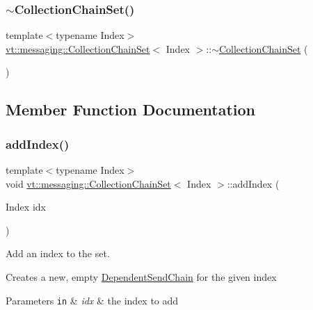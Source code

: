 \subsubsection{\texorpdfstring{$\sim$\+Collection\+Chain\+Set()}{~CollectionChainSet()}}
{\footnotesize\ttfamily template$<$typename Index$>$ \\
\hyperlink{classvt_1_1messaging_1_1_collection_chain_set}{vt\+::messaging\+::\+Collection\+Chain\+Set}$<$ Index $>$\+::$\sim$\hyperlink{classvt_1_1messaging_1_1_collection_chain_set}{Collection\+Chain\+Set} (\begin{DoxyParamCaption}{ }\end{DoxyParamCaption})\hspace{0.3cm}{\ttfamily [inline]}}



\subsection{Member Function Documentation}
\mbox{\label{classvt_1_1messaging_1_1_collection_chain_set_aefc11c9b011b4916c3b80dfc8f776239}} 
\subsubsection{\texorpdfstring{add\+Index()}{addIndex()}}
{\footnotesize\ttfamily template$<$typename Index$>$ \\
void \hyperlink{classvt_1_1messaging_1_1_collection_chain_set}{vt\+::messaging\+::\+Collection\+Chain\+Set}$<$ Index $>$\+::add\+Index (\begin{DoxyParamCaption}\item[{Index}]{idx }\end{DoxyParamCaption})\hspace{0.3cm}{\ttfamily [inline]}}



Add an index to the set. 

Creates a new, empty {\ttfamily \hyperlink{classvt_1_1messaging_1_1_dependent_send_chain}{Dependent\+Send\+Chain}} for the given index


\begin{DoxyParams}[1]{Parameters}
\mbox{\tt in}  & {\em idx} & the index to add \\
\hline
\end{DoxyParams}
\mbox{\label{classvt_1_1messaging_1_1_collection_chain_set_af1b3ca58d3d018fa2a81b86d62fec4ff}} 
